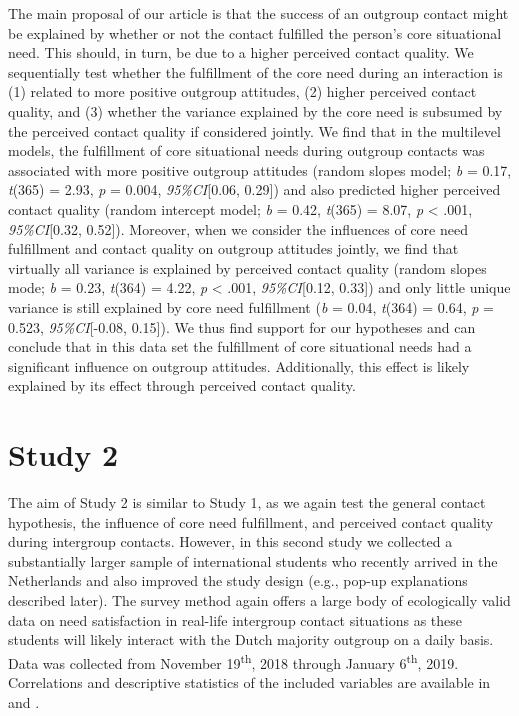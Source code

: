 The main proposal of our article is that the success of an outgroup
contact might be explained by whether or not the contact fulfilled the
person's core situational need. This should, in turn, be due to a higher
perceived contact quality. We sequentially test whether the fulfillment
of the core need during an interaction is (1) related to more positive
outgroup attitudes, (2) higher perceived contact quality, and (3)
whether the variance explained by the core need is subsumed by the
perceived contact quality if considered jointly. We find that in the
multilevel models, the fulfillment of core situational needs during
outgroup contacts was associated with more positive outgroup attitudes
(random slopes model; \textit{b} = 0.17, \textit{t}(365) = 2.93,
\textit{p} = 0.004, \textit{95\%CI}{[}0.06, 0.29{]}) and also predicted
higher perceived contact quality (random intercept model; \textit{b} =
0.42, \textit{t}(365) = 8.07, \textit{p} \textless{} .001,
\textit{95\%CI}{[}0.32, 0.52{]}). Moreover, when we consider the
influences of core need fulfillment and contact quality on outgroup
attitudes jointly, we find that virtually all variance is explained by
perceived contact quality (random slopes mode; \textit{b} = 0.23,
\textit{t}(364) = 4.22, \textit{p} \textless{} .001,
\textit{95\%CI}{[}0.12, 0.33{]}) and only little unique variance is
still explained by core need fulfillment (\textit{b} = 0.04,
\textit{t}(364) = 0.64, \textit{p} = 0.523, \textit{95\%CI}{[}-0.08,
0.15{]}). We thus find support for our hypotheses and can conclude that
in this data set the fulfillment of core situational needs had a
significant influence on outgroup attitudes. Additionally, this effect
is likely explained by its effect through perceived contact quality.

\section{Study 2}

The aim of Study 2 is similar to Study 1, as we again test the general
contact hypothesis, the influence of core need fulfillment, and
perceived contact quality during intergroup contacts. However, in this
second study we collected a substantially larger sample of international
students who recently arrived in the Netherlands and also improved the
study design (e.g., pop-up explanations described later). The survey
method again offers a large body of ecologically valid data on need
satisfaction in real-life intergroup contact situations as these
students will likely interact with the Dutch majority outgroup on a
daily basis. Data was collected from November 19\textsuperscript{th},
2018 through January 6\textsuperscript{th}, 2019. Correlations and
descriptive statistics of the included variables are available in
 and .

